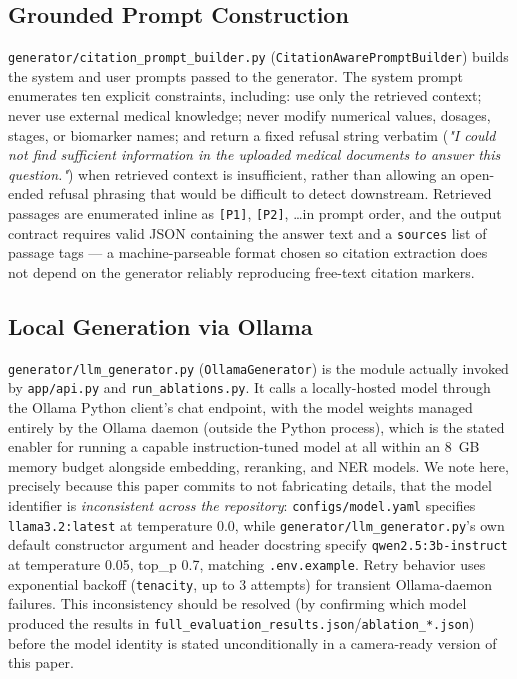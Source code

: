 \documentclass[conference]{IEEEtran}
\begin{document}
\subsection{Grounded Prompt Construction}
\texttt{generator/citation\_prompt\_builder.py} (\texttt{CitationAwarePromptBuilder}) builds the system and user prompts passed to the generator. The system prompt enumerates ten explicit constraints, including: use only the retrieved context; never use external medical knowledge; never modify numerical values, dosages, stages, or biomarker names; and return a fixed refusal string verbatim (\textit{"I could not find sufficient information in the uploaded medical documents to answer this question."}) when retrieved context is insufficient, rather than allowing an open-ended refusal phrasing that would be difficult to detect downstream. Retrieved passages are enumerated inline as \texttt{[P1]}, \texttt{[P2]}, \ldots in prompt order, and the output contract requires valid JSON containing the answer text and a \texttt{sources} list of passage tags — a machine-parseable format chosen so citation extraction does not depend on the generator reliably reproducing free-text citation markers.

\subsection{Local Generation via Ollama}
\texttt{generator/llm\_generator.py} (\texttt{OllamaGenerator}) is the module actually invoked by \texttt{app/api.py} and \texttt{run\_ablations.py}. It calls a locally-hosted model through the Ollama Python client's chat endpoint, with the model weights managed entirely by the Ollama daemon (outside the Python process), which is the stated enabler for running a capable instruction-tuned model at all within an 8~GB memory budget alongside embedding, reranking, and NER models. We note here, precisely because this paper commits to not fabricating details, that the model identifier is \emph{inconsistent across the repository}: \texttt{configs/model.yaml} specifies \texttt{llama3.2:latest} at temperature 0.0, while \texttt{generator/llm\_generator.py}'s own default constructor argument and header docstring specify \texttt{qwen2.5:3b-instruct} at temperature 0.05, top\_p 0.7, matching \texttt{.env.example}. Retry behavior uses exponential backoff (\texttt{tenacity}, up to 3 attempts) for transient Ollama-daemon failures. This inconsistency should be resolved (by confirming which model produced the results in \texttt{full\_evaluation\_results.json}/\texttt{ablation\_*.json}) before the model identity is stated unconditionally in a camera-ready version of this paper.
\end{document}
